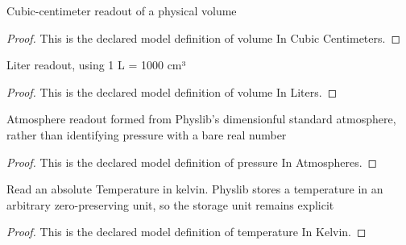 \begin{definition}
  \label{def:physics:phyx-mini-0359:phyxminiproblems-problemphyxmini0359-volumeincubiccentimeters}
  Cubic-centimeter readout of a physical volume
\end{definition}
\begin{proof}
  This is the declared model definition of volume In Cubic Centimeters.
\end{proof}
\begin{definition}
  \label{def:physics:phyx-mini-0359:phyxminiproblems-problemphyxmini0359-volumeinliters}
  Liter readout, using 1 L = 1000 cm³
\end{definition}
\begin{proof}
  This is the declared model definition of volume In Liters.
\end{proof}
\begin{definition}
  \label{def:physics:phyx-mini-0359:phyxminiproblems-problemphyxmini0359-pressureinatmospheres}
  Atmosphere readout formed from Physlib's dimensionful standard atmosphere, rather than identifying pressure with a bare real number
\end{definition}
\begin{proof}
  This is the declared model definition of pressure In Atmospheres.
\end{proof}
\begin{definition}
  \label{def:physics:phyx-mini-0359:phyxminiproblems-problemphyxmini0359-temperatureinkelvin}
  Read an absolute Temperature in kelvin. Physlib stores a temperature in an arbitrary zero-preserving unit, so the storage unit remains explicit
\end{definition}
\begin{proof}
  This is the declared model definition of temperature In Kelvin.
\end{proof}
